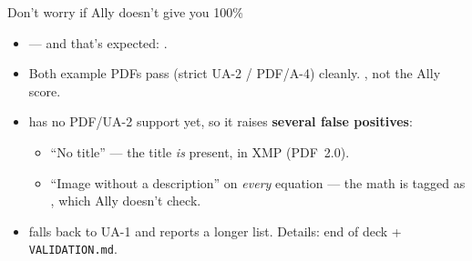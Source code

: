 \begin{frame}{Don't worry if Ally doesn't give you 100\%}

\begin{itemize}
\item {} --- and that's expected: .
\item Both example PDFs pass  (strict UA-2 / PDF/A-4) cleanly. , not the Ally score.
\item {} has no PDF/UA-2 support yet, so it raises \textbf{several false positives}:
  \begin{itemize}
  \item ``No title'' --- the title \emph{is} present, in XMP (PDF~2.0).
  \item ``Image without a description'' on \emph{every} equation --- the math is tagged as , which Ally doesn't check.
  \end{itemize}
\item {} falls back to UA-1 and reports a longer list. Details: end of deck + \texttt{VALIDATION.md}.
\end{itemize}

\bigskip

\begin{center}
\setlength{\fboxsep}{5pt}%
\end{center}
\end{frame}

